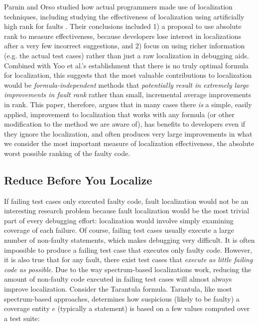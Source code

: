 Parnin and Orso studied how actual programmers made use of
localization techniques, including studying the effectiveness of
localization using artificially high rank for faults \cite{AutoHelp}.
Their conclusions included 1) a proposal to use absolute rank to
measure effectiveness, because developers lose interest in
localizations after a very few incorrect suggestions, and 2) focus on
using richer information (e.g. the actual test cases) rather than just
a raw localization in debugging aids.  Combined with Yoo et al.'s
establishment \cite{yoo2014no} that there is no truly optimal formula
for localization, this suggests that the most valuable contributions
to localization would be \emph{formula-independent} methods that
\emph{potentially result in extremely large improvements in fault
rank} rather than small, incremental average improvements in rank.
This paper, therefore, argues that in many cases there \emph{is} a
simple, easily applied, improvement to localization that works with
any formula (or other modification to the method we are aware of), has
benefits to developers even if they ignore the localization, and often
produces very large improvements in what we consider the most
important measure of localization effectiveness, the absolute worst
possible ranking of the faulty code.

\subsection{Reduce Before You Localize}

If failing test cases only executed faulty code, fault localization
would not be an interesting research problem because fault
localization would be the most trivial part of every debugging effort:
localization would involve simply examining coverage of each failure.
Of course, failing test cases usually execute a large number of
non-faulty statements, which makes debugging very difficult.  It is
often impossible to produce a failing test case that
executes only faulty code.  However, it is also true that for any
fault, there exist test cases that \emph{execute as little failing
code as possible}.  Due to the way spectrum-based localizations work,
reducing the amount of non-faulty code executed in failing test cases
will almost always improve localization.  Consider the Tarantula
\cite{Jones2002,Tarantula} formula.  Tarantula, like most spectrum-based
approaches, determines how suspicious (likely to be faulty) a coverage
entity $e$ (typically a statement) is based on a few values computed over
a test suite:

